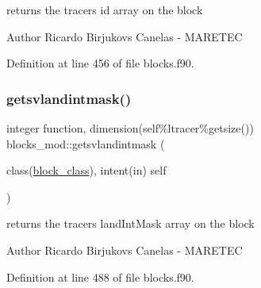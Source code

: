 returns the tracers id array on the block 

\begin{DoxyAuthor}{Author}
Ricardo Birjukovs Canelas -\/ M\+A\+R\+E\+T\+EC 
\end{DoxyAuthor}


Definition at line 456 of file blocks.\+f90.


\mbox{\label{namespaceblocks__mod_a046c07d2d955655055d78e37b6e622ef}} 
\subsubsection{\texorpdfstring{getsvlandintmask()}{getsvlandintmask()}}
{\footnotesize\ttfamily integer function, dimension(self\%ltracer\%getsize()) blocks\+\_\+mod\+::getsvlandintmask (\begin{DoxyParamCaption}\item[{class(\mbox{\hyperlink{structblocks__mod_1_1block__class}{block\+\_\+class}}), intent(in)}]{self }\end{DoxyParamCaption})\hspace{0.3cm}{\ttfamily [private]}}



returns the tracers land\+Int\+Mask array on the block 

\begin{DoxyAuthor}{Author}
Ricardo Birjukovs Canelas -\/ M\+A\+R\+E\+T\+EC 
\end{DoxyAuthor}


Definition at line 488 of file blocks.\+f90.


